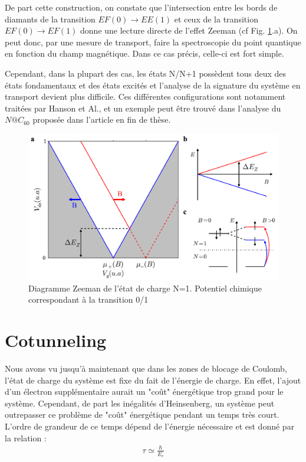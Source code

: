 De part cette construction, on constate que l'intersection entre les bords de diamants de la transition $EF(0)\rightarrow EE(1)$ et ceux de la transition $EF(0)\rightarrow EF(1)$ donne une lecture directe de l'effet Zeeman (cf Fig. \ref{charge_discharge}.a). On peut donc, par une mesure de transport, faire la spectroscopie du point quantique en fonction du champ magnétique. Dans ce cas précis, celle-ci est fort simple.

 Cependant, dans la plupart des cas, les états N/N+1 possèdent tous deux des états fondamentaux et des états excités et l'analyse de la signature du système en transport devient plus difficile. Ces différentes configurations sont notamment traitées par Hanson et Al., et un exemple peut \^etre trouvé dans l'analyse du $N@C_{60}$ proposée dans l'article en fin de thèse.

\begin{figure}
\includegraphics[scale=0.5]{Theorie/Transport/figure4/figure4.pdf} 
\caption{Diagramme Zeeman de l'état de charge N=1. Potentiel chimique correspondant à la transition 0/1}
\label{charge_discharge}
\end{figure}

\section{Cotunneling}
Nous avons vu jusqu'à maintenant que dans les zones de blocage de Coulomb, l'état de charge du système est fixe du fait de l'énergie de charge. En effet, l'ajout d'un électron supplémentaire aurait un "co\^ut" énergétique trop grand pour le système. Cependant, de part les inégalités d'Heinsenberg, un système peut outrepasser ce problème de "co\^ut" énergétique pendant un temps très court. L'ordre de grandeur de ce temps dépend de l'énergie nécessaire et est donné par la relation :
\begin{eqnarray}
\tau \simeq \frac{\hbar}{E_c} \nonumber
\end{eqnarray}


